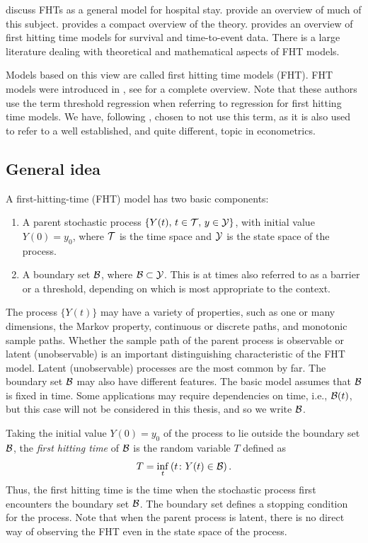 \citet{eaton-whitmore} discuss FHTs as a general model for hospital stay.
\citet{aalengjessing2001} provide an overview of much of this subject.
\citet{lawless2011} provides a compact overview of the theory.
\citet{leewhitmore2004a} provides an overview of first hitting time models for survival and time-to-event data.
There is a large literature dealing with theoretical and mathematical aspects of FHT models.

Models based on this view are called first hitting time models (FHT).
FHT models were introduced in \citet{whitmore1986}, see \citet{leewhitmore2006} for a complete overview.
Note that these authors use the term threshold regression when referring to regression for first hitting time models.
We have, following \citet{caroni2017}, chosen to not use this term, as it is also used to refer to a well established, and quite different, topic in econometrics.

\subsection{General idea}\label{fht-idea}
A first-hitting-time (FHT) model has two basic components:
\begin{enumerate}
\item A parent stochastic process $\{Y(t),\,t\in\mathcal{T},\,y\in\mathcal{Y}\}$, with initial value $Y(0)=y_0$, where $\mathcal{T}$ is the time space and $\mathcal{Y}$ is the state space of the process.
\item A boundary set $\mathcal{B}$, where $\mathcal{B}\subset\mathcal{Y}$. This is at times also referred to as a barrier or a threshold, depending on which is most appropriate to the context.
\end{enumerate}
The process $\{Y(t)\}$ may have a variety of properties, such as one or many dimensions, the Markov property, continuous or discrete paths, and monotonic sample paths. Whether the sample path of the parent process is observable or latent (unobservable) is an important distinguishing characteristic of the FHT model. Latent (unobservable) processes are the most common by far. The boundary set $\mathcal{B}$ may also have different features. The basic model assumes that $\mathcal{B}$ is fixed in time.
Some applications may require dependencies on time, i.e., $\mathcal{B}(t)$, but this case will not be considered in this thesis, and so we write $\mathcal{B}$.

Taking the initial value $Y(0)=y_0$ of the process to lie outside the boundary set $\mathcal{B}$, the \textit{first hitting time} of $\mathcal{B}$ is the random variable $T$ defined as
\begin{equation}\label{eq:fht-t}
    T=\inf_t\left(t\colon Y(t)\in\mathcal{B}\right).
\end{equation}
Thus, the first hitting time is the time when the stochastic process first encounters the boundary set $\mathcal{B}$.
The boundary set defines a stopping condition for the process.
Note that when the parent process is latent, there is no direct way of observing the FHT even in the state space of the process.


